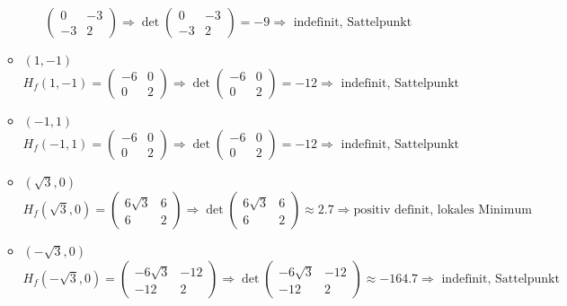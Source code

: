 \documentclass[10pt,a4paper,parskip=half]{scrartcl}
\begin{document}
\begin{enumerate}[(i)]
\begin{itemize}
\[			\begin{pmatrix}
				0 & -3 \\
				-3 & 2		
			\end{pmatrix} \Rightarrow 
			\det \begin{pmatrix}
				0 & -3 \\
				-3 & 2		
			\end{pmatrix} = -9 \Rightarrow \text{ indefinit, Sattelpunkt}\]
		\item 	$(1,-1)$
			\[H_f(1,-1) = 
			\begin{pmatrix}
				-6 & 0 \\
				0 & 2		
			\end{pmatrix} \Rightarrow 
			\det \begin{pmatrix}
				-6 & 0 \\
				0 & 2		
			\end{pmatrix} = -12 \Rightarrow \text{ indefinit, Sattelpunkt}\]
		\item  	$(-1,1)$
			\[H_f(-1,1) = 
			\begin{pmatrix}
				-6 & 0 \\
				0 & 2		
			\end{pmatrix} \Rightarrow 
			\det \begin{pmatrix}
				-6 & 0 \\
				0 & 2		
			\end{pmatrix} = -12 \Rightarrow \text{ indefinit, Sattelpunkt}\]
		\item 	$(\sqrt{3},0)$
			\[H_f(\sqrt{3},0) = 
			\begin{pmatrix}
				6\sqrt{3} & 6 \\
				6 & 2		
			\end{pmatrix} \Rightarrow 
			\det \begin{pmatrix}
				6\sqrt{3} & 6 \\
				6 & 2	
			\end{pmatrix} \approx 2.7 \Rightarrow \text{positiv definit, lokales Minimum}\]
		\item  	$(-\sqrt{3},0)$
			\[H_f(-\sqrt{3},0) = 
			\begin{pmatrix}
				-6\sqrt{3} & -12 \\
				-12 & 2		
			\end{pmatrix} \Rightarrow 
			\det \begin{pmatrix}
				-6\sqrt{3} & -12 \\
				-12 & 2	
			\end{pmatrix} \approx -164.7 \Rightarrow \text{ indefinit, Sattelpunkt}\]
	\end{itemize}
	

\end{enumerate}
\end{document}
